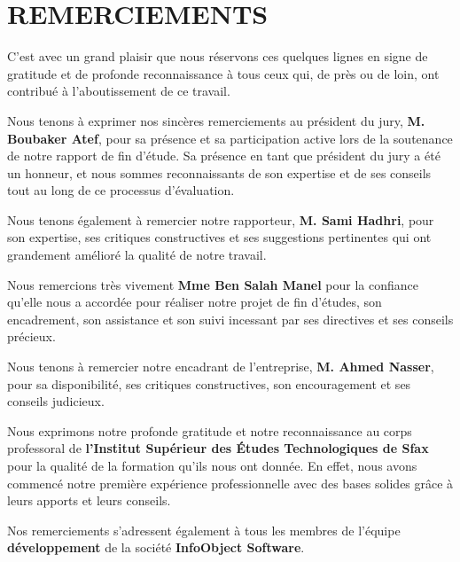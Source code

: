 \chapter*{REMERCIEMENTS}
\thispagestyle{MyStyle}
\begin{sloppypar}
\begin{center}

C’est avec un grand plaisir que nous réservons ces quelques lignes en signe de gratitude et de profonde reconnaissance à tous ceux qui, de près ou de loin, ont contribué à l’aboutissement de ce travail.\

Nous tenons à exprimer nos sincères remerciements au président du jury, \textbf{M. Boubaker Atef}, pour sa présence et sa participation active lors de la soutenance de notre rapport de fin d'étude. Sa présence en tant que président du jury a été un honneur, et nous sommes reconnaissants de son expertise et de ses conseils tout au long de ce processus d'évaluation.

Nous tenons également à remercier notre rapporteur, \textbf{M. Sami Hadhri}, pour son expertise, ses critiques constructives et ses suggestions pertinentes qui ont grandement amélioré la qualité de notre travail.

Nous remercions très vivement \textbf{Mme Ben Salah Manel} pour la confiance qu’elle nous a accordée pour réaliser notre projet de fin d’études, son encadrement, son assistance et son suivi incessant par ses directives et ses conseils précieux.

Nous tenons à remercier notre encadrant de l’entreprise, \textbf{M. Ahmed Nasser}, pour sa disponibilité, ses critiques constructives, son encouragement et ses conseils judicieux.

Nous exprimons notre profonde gratitude et notre reconnaissance au corps professoral de \textbf{l'Institut Supérieur des Études Technologiques de Sfax} pour la qualité de la formation qu'ils nous ont donnée. En effet, nous avons commencé notre première expérience professionnelle avec des bases solides grâce à leurs apports et leurs conseils.

Nos remerciements s’adressent également à tous les membres de l’équipe \textbf{développement} de la société \textbf{InfoObject Software}.

\end{center}
\end{sloppypar}